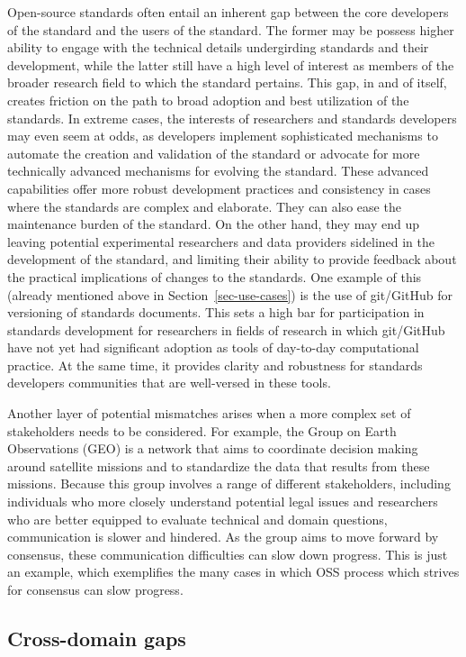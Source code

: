 \documentclass[
  number]{elsarticle}
\begin{document}
Open-source standards often entail an inherent gap between the core
developers of the standard and the users of the standard. The former may
be possess higher ability to engage with the technical details
undergirding standards and their development, while the latter still
have a high level of interest as members of the broader research field
to which the standard pertains. This gap, in and of itself, creates
friction on the path to broad adoption and best utilization of the
standards. In extreme cases, the interests of researchers and standards
developers may even seem at odds, as developers implement sophisticated
mechanisms to automate the creation and validation of the standard or
advocate for more technically advanced mechanisms for evolving the
standard. These advanced capabilities offer more robust development
practices and consistency in cases where the standards are complex and
elaborate. They can also ease the maintenance burden of the standard. On
the other hand, they may end up leaving potential experimental
researchers and data providers sidelined in the development of the
standard, and limiting their ability to provide feedback about the
practical implications of changes to the standards. One example of this
(already mentioned above in Section~\ref{sec-use-cases}) is the use of
git/GitHub for versioning of standards documents. This sets a high bar
for participation in standards development for researchers in fields of
research in which git/GitHub have not yet had significant adoption as
tools of day-to-day computational practice. At the same time, it
provides clarity and robustness for standards developers communities
that are well-versed in these tools.

Another layer of potential mismatches arises when a more complex set of
stakeholders needs to be considered. For example, the Group on Earth
Observations (GEO) is a network that aims to coordinate decision making
around satellite missions and to standardize the data that results from
these missions. Because this group involves a range of different
stakeholders, including individuals who more closely understand
potential legal issues and researchers who are better equipped to
evaluate technical and domain questions, communication is slower and
hindered. As the group aims to move forward by consensus, these
communication difficulties can slow down progress. This is just an
example, which exemplifies the many cases in which OSS process which
strives for consensus can slow progress.

\subsection{Cross-domain gaps}\label{cross-domain-gaps}
\end{document}
